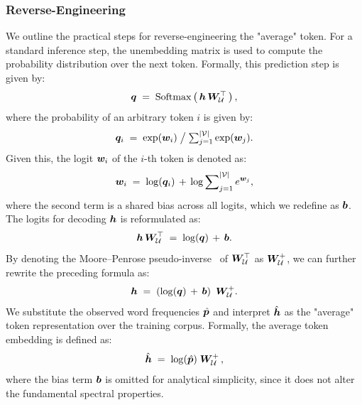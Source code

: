 \documentclass[sigconf]{acmart}
\begin{document}
\subsubsection{Reverse-Engineering}
We outline the practical steps for reverse-engineering the "average" token.
For a standard inference step, the unembedding matrix is used to compute the probability distribution over the next token.
Formally, this prediction step is given by:
{\Large \begin{equation*}
    {\bm{q}} \; = \; \operatorname{Softmax} \left( \, {\bm{h}} \, {\bm{W}}_\mathcal{U}^\top \, \right),
\end{equation*}}
where the probability of an arbitrary token \(i\) is given by:
{\Large \begin{equation*}
    {\bm{q}}_i \; = \; \exp({\bm{w}}_i) \; \big/ \; {\textstyle \sum_{j=1}^{|\mathcal{V}|}} \exp({\bm{w}}_j).
\end{equation*}}
Given this, the logit ${\bm{w}}_i$ of the \(i\)-th token is denoted as:
{\Large \[
    {\bm{w}}_i \; = \; \log({\bm{q}}_i) \, + \, \log \sum\nolimits_{j=1}^{|\mathcal{V}|} e^{{\bm{w}}_j},
\]}
where the second term is a shared bias across all logits, which we redefine as ${\bm{b}}$.
The logits for decoding \({\bm{h}}\) is reformulated as:
{\Large \[
    {\bm{h}} \, {\bm{W}}_\mathcal{U}^\top \; = \; \log({\bm{q}}) \, + \, {\bm{b}}.
\]}
By denoting the Moore–Penrose pseudo-inverse~\cite{inverse} of \({\bm{W}}_\mathcal{U}^\top\) as \({\bm{W}}_\mathcal{U}^{+}\), we can further rewrite the preceding formula as:
{\Large \[
    {\bm{h}} \; = \; \left( \log({\bm{q}}) \, + \, {\bm{b}} \right) \, \, {\bm{W}}_\mathcal{U}^{+}.
\]}
We substitute the observed word frequencies \(\hat{{\bm{p}}}\) and interpret \(\hat{{\bm{h}}}\) as the "average" token representation over the training corpus.
Formally, the average token embedding is defined as:
{\Large \[
    \hat{{\bm{h}}} \; = \; \log(\hat{{\bm{p}}}) \; {\bm{W}}_{\mathcal{U}}^+ \,,
\]}
where the bias term ${\bm{b}}$ is omitted for analytical simplicity, since it does not alter the fundamental spectral properties.
\end{document}
